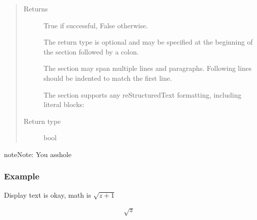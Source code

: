 \documentclass[letterpaper,10pt,english]{sphinxmanual}
\begin{document}
\begin{description}
\begin{fulllineitems}
\begin{quote}
\begin{description}
\item[{Returns}] \leavevmode

True if successful, False otherwise.

The return type is optional and may be specified at the beginning of
the  section followed by a colon.

The  section may span multiple lines and paragraphs.
Following lines should be indented to match the first line.

The  section supports any reStructuredText formatting,
including literal blocks:

\begin{sphinxVerbatim}[commandchars=\\\{\}]
     
     
\end{sphinxVerbatim}


\item[{Return type}] \leavevmode
bool

\end{description}\end{quote}

\begin{sphinxadmonition}{note}{Note:}
You asshole
\end{sphinxadmonition}

\begin{sphinxVerbatim}[commandchars=\\\{\}]
\end{sphinxVerbatim}
\subsubsection*{Example}

Display text is okay, math is \(\sqrt{z + 1}\)

\begin{sphinxVerbatim}[commandchars=\\\{\}]
  
\end{sphinxVerbatim}
\begin{equation*}
\begin{split}\sqrt{z}\end{split}
\end{equation*}
\end{fulllineitems}


\end{description}
\end{document}
